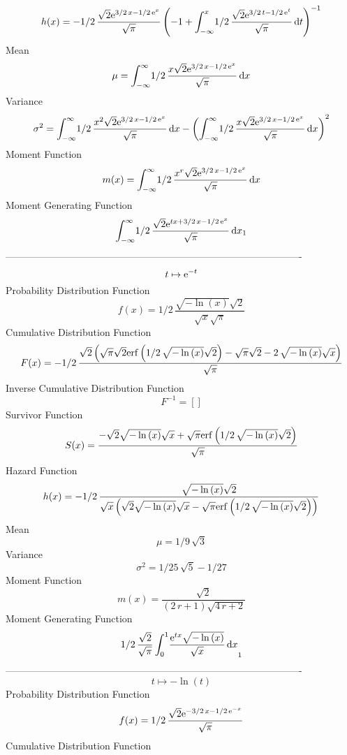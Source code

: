 \documentclass[12pt]{article}
\begin{document}
 $$ h(x)=-1/2\,{\frac {\sqrt {2}{{\rm e}^{3/2\,x-1/2\,{{\rm e}^{x}}}}}{\sqrt {
\pi}} \left( -1+\int_{-\infty }^{x}\!1/2\,{\frac {\sqrt {2}{{\rm e}^{3
/2\,t-1/2\,{{\rm e}^{t}}}}}{\sqrt {\pi}}}\,{\rm d}t \right) ^{-1}}
$$Mean 
 $$ \mu=\int_{-\infty }^{\infty }\!1/2\,{\frac {x\sqrt {2}{{\rm e}^{3/2\,x-1/2
\,{{\rm e}^{x}}}}}{\sqrt {\pi}}}\,{\rm d}x
$$ Variance 
 $$ \sigma^2 = \int_{-\infty }^{\infty }\!1/2\,{\frac {{x}^{2}\sqrt {2}{{\rm e}^{3/2
\,x-1/2\,{{\rm e}^{x}}}}}{\sqrt {\pi}}}\,{\rm d}x- \left( \int_{-
\infty }^{\infty }\!1/2\,{\frac {x\sqrt {2}{{\rm e}^{3/2\,x-1/2\,{
{\rm e}^{x}}}}}{\sqrt {\pi}}}\,{\rm d}x \right) ^{2}
$$Moment Function 
 $$ m(x) = \int_{-\infty }^{\infty }\!1/2\,{\frac {{x}^{r}\sqrt {2}{{\rm e}^{3/2
\,x-1/2\,{{\rm e}^{x}}}}}{\sqrt {\pi}}}\,{\rm d}x
$$ Moment Generating Function 
 $$\int_{-\infty }^{\infty }\!1/2\,{\frac {\sqrt {2}{{\rm e}^{tx+3/2\,x-1
/2\,{{\rm e}^{x}}}}}{\sqrt {\pi}}}\,{\rm d}x_{{1}}
$$-------------------------------------------------------------------------------------------  \\$$t\mapsto {{\rm e}^{-t}}
$$Probability Distribution Function 
$$  f(x)=1/2\,{\frac {\sqrt {-\ln  \left( x \right) }\sqrt {2}}{\sqrt {x}\sqrt 
{\pi}}}
$$Cumulative Distribution Function  
 $$F(x)=-1/2\,{\frac {\sqrt {2} \left( \sqrt {\pi}\sqrt {2}{\rm erf} \left(1/2
\,\sqrt {-\ln  \left( x \right) }\sqrt {2}\right)-\sqrt {\pi}\sqrt {2}
-2\,\sqrt {-\ln  \left( x \right) }\sqrt {x} \right) }{\sqrt {\pi}}}
$$ Inverse Cumulative Distribution Function 
  $$F^{-1} = []
$$Survivor Function 
 $$ S(x)={\frac {-\sqrt {2}\sqrt {-\ln  \left( x \right) }\sqrt {x}+\sqrt {\pi}
{\rm erf} \left(1/2\,\sqrt {-\ln  \left( x \right) }\sqrt {2}\right)}{
\sqrt {\pi}}}
$$ Hazard Function 
 $$ h(x)=-1/2\,{\frac {\sqrt {-\ln  \left( x \right) }\sqrt {2}}{\sqrt {x}
 \left( \sqrt {2}\sqrt {-\ln  \left( x \right) }\sqrt {x}-\sqrt {\pi}
{\rm erf} \left(1/2\,\sqrt {-\ln  \left( x \right) }\sqrt {2}\right)
 \right) }}
$$Mean 
 $$ \mu=1/9\,\sqrt {3}
$$ Variance 
 $$ \sigma^2 = 1/25\,\sqrt {5}-1/27
$$Moment Function 
 $$ m(x) = {\frac {\sqrt {2}}{ \left( 2\,r+1 \right) \sqrt {4\,r+2}}}
$$ Moment Generating Function 
 $$1/2\,{\frac {\sqrt {2}}{\sqrt {\pi}}\int_{0}^{1}\!{\frac {{{\rm e}^{tx
}}\sqrt {-\ln  \left( x \right) }}{\sqrt {x}}}\,{\rm d}x}_{{1}}
$$-------------------------------------------------------------------------------------------  \\$$t\mapsto -\ln  \left( t \right) 
$$Probability Distribution Function 
$$  f(x)=1/2\,{\frac {\sqrt {2}{{\rm e}^{-3/2\,x-1/2\,{{\rm e}^{-x}}}}}{\sqrt {
\pi}}}
$$Cumulative Distribution Function  
\end{document}
